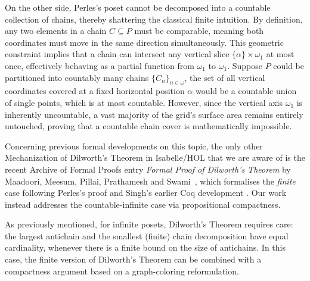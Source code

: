 \documentclass[11pt,a4paper]{article}
\begin{document}
On the other side, Perles's poset cannot be decomposed into a countable collection of chains, thereby shattering the classical finite intuition. By definition, any two elements in a chain $C \subseteq P$ must be comparable, meaning both coordinates must move in the same direction simultaneously. This geometric constraint implies that a chain can intersect any vertical slice $\{\alpha\} \times \omega_1$ at most once, effectively behaving as a partial function from $\omega_1$ to $\omega_1$. Suppose $P$ could be partitioned into countably many chains $\{C_n\}_{n \in \omega}$, the set of all vertical coordinates covered at a fixed horizontal position $\alpha$ would be a countable union of single points, which is at most countable. However, since the vertical axis $\omega_1$ is inherently uncountable, a vast majority of the grid's surface area remains entirely untouched, proving that a countable chain cover is mathematically impossible.


Concerning previous formal developments on this topic, the only other
Mechanization of Dilworth's Theorem in Isabelle/HOL that we are aware of is the
recent Archive of Formal Proofs entry \emph{Formal Proof of Dilworth's Theorem}
by Maadoori, Meesum, Pillai, Prathamesh and Swami~\cite{DilworthAFP2025}, which
formalises the \emph{finite} case following Perles's proof and Singh's earlier
Coq development \cite{singh2017}. Our work instead addresses the countable-infinite case via propositional compactness.


As previously mentioned, for infinite posets, Dilworth's Theorem requires care:  the largest antichain and the smallest (finite) chain decomposition have equal cardinality, whenever there is a finite bound on the size of antichains. In this case, the finite version of Dilworth's Theorem can be combined with a compactness argument based on a graph-coloring reformulation.
\end{document}
